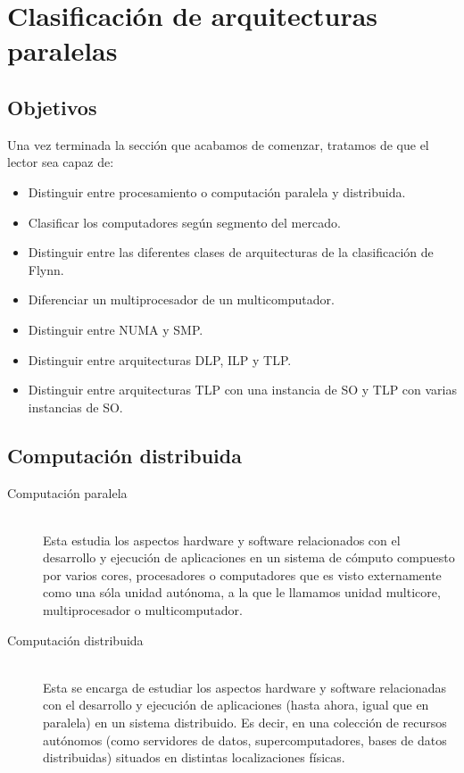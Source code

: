 \newpage
\section{Clasificación de arquitecturas paralelas}
\subsection{Objetivos}
Una vez terminada la sección que acabamos de comenzar, tratamos de que el lector sea capaz de:
\begin{itemize}
    \item Distinguir entre procesamiento o computación paralela y distribuida.
    \item Clasificar los computadores según segmento del mercado.
    \item Distinguir entre las diferentes clases de arquitecturas de la clasificación de Flynn.
    \item Diferenciar un multiprocesador de un multicomputador.
    \item Distinguir entre NUMA y SMP.
    \item Distinguir entre arquitecturas DLP, ILP y TLP.
    \item Distinguir entre arquitecturas TLP con una instancia de SO y TLP con varias instancias de SO.
\end{itemize}

\subsection{Computación distribuida}
\begin{description}
    \item [Computación paralela]~\\
        Esta estudia los aspectos hardware y software relacionados con el desarrollo y ejecución de aplicaciones en un sistema de cómputo compuesto por varios cores, procesadores o computadores que es visto externamente como una sóla unidad autónoma, a la que le llamamos unidad multicore, multiprocesador o multicomputador.

    \item [Computación distribuida]~\\
        Esta se encarga de estudiar los aspectos hardware y software relacionadas con el desarrollo y ejecución de aplicaciones (hasta ahora, igual que en paralela) en un sistema distribuido. Es decir, en una colección de recursos autónomos (como servidores de datos, supercomputadores, bases de datos distribuidas) situados en distintas localizaciones físicas.
\end{description}

